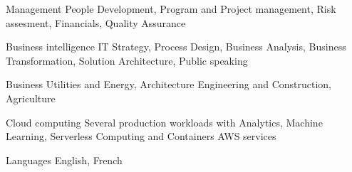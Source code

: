 
\begin{cvskills}

  \cvskill
    {Management} %
    {People Development, Program and Project management, Risk assesment, Financials, Quality Assurance} %

  \cvskill
    {Business intelligence} %
    {IT Strategy, Process Design, Business Analysis, Business Transformation, Solution Architecture, Public speaking} %

  \cvskill
    {Business} %
    {Utilities and Energy, Architecture Engineering and Construction, Agriculture} %

  \cvskill
    {Cloud computing} %
    {Several production workloads with Analytics, Machine Learning, Serverless Computing and Containers AWS services} %



  \cvskill
    {Languages} %
    {English, French} %

\end{cvskills}
